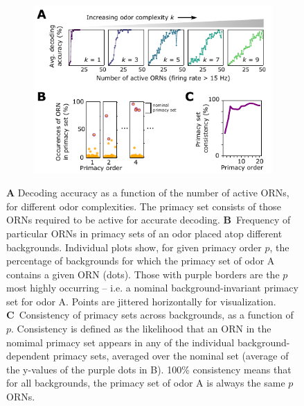 \documentclass[9pt,twocolumn,twoside]{pnas-new}
\begin{document}
\begin{figure}[tb]
	\begin{subfigure}[t]{\linewidth}
		\includegraphics[width=\textwidth]{figures/4_primacy_coding}
		\label{fig:primacy_coding_a}	
	\end{subfigure}
	\begin{subfigure}[t]{0\linewidth}
		\label{fig:primacy_coding_b}
	\end{subfigure}
	\begin{subfigure}[t]{0\linewidth}
		\label{fig:primacy_coding_c}
	\end{subfigure}
	\caption{\footnotesize{
	\textbf{A} Decoding accuracy as a function of the number of active ORNs, for different odor complexities. The primacy set consists of those ORNs required to be active for accurate decoding. %
	\textbf{B}~Frequency of particular ORNs in primacy sets of an odor placed atop different backgrounds. Individual plots show, for given primacy order $p$, the percentage of backgrounds for which the primacy set of odor A contains a given ORN (dots). Those with purple borders are the $p$ most highly occurring -- i.e. a nominal background-invariant primacy set for odor A. Points are jittered horizontally for visualization.
	\textbf{C}~Consistency of primacy sets across backgrounds, as a function of $p$. Consistency is defined as the likelihood that an ORN in the nomimal primacy set appears in any of the individual background-dependent primacy sets, averaged over the nominal set (average of the y-values of the purple dots in B). 100\% consistency means that for all backgrounds, the primacy set of odor A is always the same $p$ ORNs.
	}}
	\label{fig:primacy_coding}
\end{figure}
\end{document}
